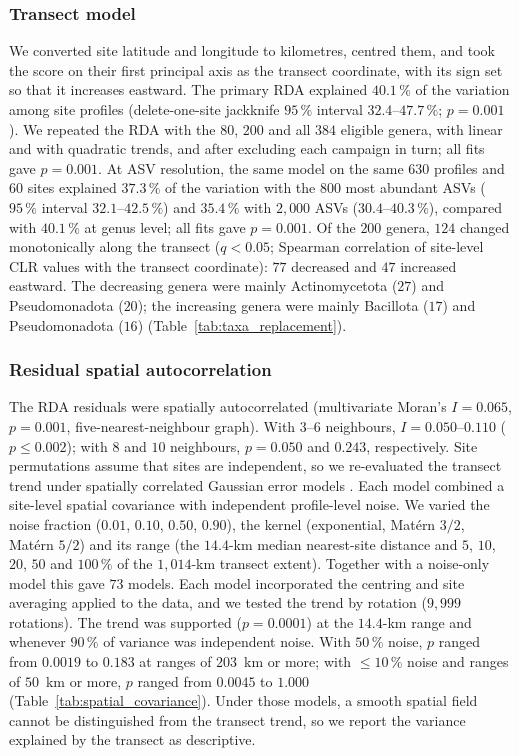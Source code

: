 \documentclass[11pt]{article}
\begin{document}
\subsubsection{Transect model}\label{sup:beta_transect}
We converted site latitude and longitude to kilometres, centred them, and took
the score on their first principal axis as the transect coordinate, with its
sign set so that it increases eastward. The primary RDA explained $40.1\,\%$ of
the variation among site profiles (delete-one-site jackknife $95\,\%$ interval
$32.4$--$47.7\,\%$; $p=0.001$). We repeated the RDA with the $80$, $200$ and all
$384$ eligible genera, with linear and with quadratic trends, and after
excluding each campaign in turn; all fits gave $p=0.001$. At ASV resolution, the same model on the same $630$ profiles and $60$ sites explained $37.3\,\%$ of the variation with the $800$ most abundant ASVs ($95\,\%$ interval $32.1$--$42.5\,\%$) and $35.4\,\%$ with $2{,}000$ ASVs ($30.4$--$40.3\,\%$), compared with $40.1\,\%$ at genus level; all fits gave $p=0.001$. Of the $200$ genera, $124$ changed monotonically along the
transect ($q<0.05$; Spearman correlation of site-level CLR values with the
transect coordinate): $77$ decreased and $47$ increased eastward. The decreasing
genera were mainly Actinomycetota ($27$) and Pseudomonadota ($20$); the
increasing genera were mainly Bacillota ($17$) and Pseudomonadota ($16$)
(Table~\ref{tab:taxa_replacement}).


\subsubsection{Residual spatial autocorrelation}\label{sup:beta_spatialerrors}
The RDA residuals were spatially autocorrelated (multivariate Moran's
$I=0.065$, $p=0.001$, five-nearest-neighbour graph). With $3$--$6$ neighbours, $I=0.050$--$0.110$ ($p\leq0.002$); with $8$ and $10$ neighbours, $p=0.050$ and $0.243$, respectively. Site permutations assume that sites are
independent, so we re-evaluated the transect trend under spatially correlated
Gaussian error models \cite{langsrud2005rotation}. Each model combined a
site-level spatial covariance with independent profile-level noise. We varied
the noise fraction ($0.01$, $0.10$, $0.50$, $0.90$), the kernel (exponential,
Mat\'ern $3/2$, Mat\'ern $5/2$) and its range (the $14.4$-km median
nearest-site distance and $5$, $10$, $20$, $50$ and $100\,\%$ of the
$1{,}014$-km transect extent). Together with a noise-only model this gave $73$
models. Each model incorporated the centring and site averaging applied to the
data, and we tested the trend by rotation ($9{,}999$ rotations). The trend was supported ($p=0.0001$) at the $14.4$-km range and whenever $90\,\%$ of variance was independent noise. With $50\,\%$ noise, $p$ ranged from $0.0019$ to $0.183$ at ranges of $203$~km or more; with $\leq10\,\%$ noise and ranges of $50$~km or more, $p$ ranged from $0.0045$ to $1.000$ (Table~\ref{tab:spatial_covariance}). Under those models, a smooth
spatial field cannot be distinguished from the transect trend, so we report the
variance explained by the transect as descriptive.
\end{document}
